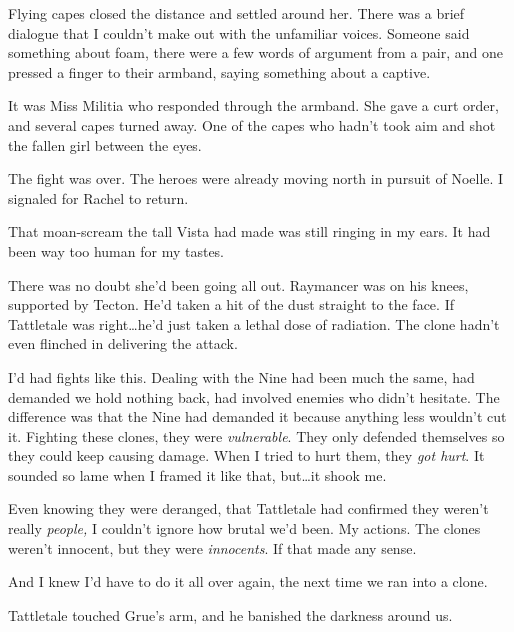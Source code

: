 Flying capes closed the distance and settled around her.  There was a brief dialogue that I couldn't make out with the unfamiliar voices.  Someone said something about foam, there were a few words of argument from a pair, and one pressed a finger to their armband, saying something about a captive.



It was Miss Militia who responded through the armband.  She gave a curt order, and several capes turned away.  One of the capes who hadn't took aim and shot the fallen girl between the eyes.



The fight was over.  The heroes were already moving north in pursuit of Noelle.  I signaled for Rachel to return.



That moan-scream the tall Vista had made was still ringing in my ears.  It had been way too human for my tastes.



There was no doubt she'd been going all out.  Raymancer was on his knees, supported by Tecton.  He'd taken a hit of the dust straight to the face.  If Tattletale was right\ldots he'd just taken a lethal dose of radiation.  The clone hadn't even flinched in delivering the attack.



I'd had fights like this.  Dealing with the Nine had been much the same, had demanded we hold nothing back, had involved enemies who didn't hesitate.  The difference was that the Nine had demanded it because anything less wouldn't cut it.  Fighting these clones, they were \emph{vulnerable}.  They only defended themselves so they could keep causing damage.  When I tried to hurt them, they \emph{got hurt}.  It sounded so lame when I framed it like that, but\ldots it shook me.



Even knowing they were deranged, that Tattletale had confirmed they weren't really \emph{people,} I couldn't ignore how brutal we'd been.  My actions.  The clones weren't innocent, but they were \emph{innocents}.  If that made any sense.



And I knew I'd have to do it all over again, the next time we ran into a clone.



Tattletale touched Grue's arm, and he banished the darkness around us.



